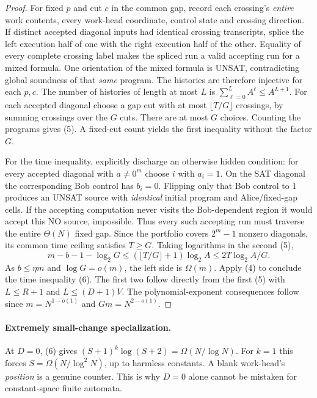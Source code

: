 \documentclass[11pt]{article}
\begin{document}
\begin{proof}
For fixed $p$ and cut $c$ in the common gap, record each
crossing's \emph{entire} work contents, every work-head
coordinate, control state and crossing direction. If distinct
accepted diagonal inputs had identical crossing transcripts,
splice the left execution half of one with the right execution
half of the other. Equality of every complete crossing label
makes the spliced run a valid accepting run for a mixed
formula. One orientation of the mixed formula is UNSAT,
contradicting global soundness of that \emph{same} program.
The histories are therefore injective for each $p,c$.
The number of histories of length at most $L$ is
$\sum_{\ell=0}^L A^\ell\le A^{L+1}$.
For each accepted diagonal choose a gap cut with at most
$\lfloor T/G\rfloor$ crossings, by summing crossings over the
$G$ cuts. There are at most $G$ choices. Counting the programs
gives (5). A fixed-cut count yields the first inequality
without the factor $G$.

For the time inequality, explicitly discharge an otherwise
hidden condition: for every accepted diagonal with $a\ne0^m$
choose $i$ with $a_i=1$. On the SAT diagonal the corresponding
Bob control has $b_i=0$. Flipping only that Bob control to $1$
produces an UNSAT source with \emph{identical} initial program
and Alice/fixed-gap cells. If the accepting computation never
visits the Bob-dependent region it would accept this NO
source, impossible. Thus every such accepting run must
traverse the entire $\Theta(N)$ fixed gap. Since the portfolio
covers $2^m-1$ nonzero diagonals, its common time ceiling
satisfies $T\ge G$. Taking logarithms in the second (5),
\[
  m-b-1-\log_2 G
  \le(\lfloor T/G\rfloor+1)\log_2 A
  \le 2T\log_2 A/G.
\]
As $b\le\eta m$ and $\log G=o(m)$, the left side is
$\Omega(m)$. Apply (4) to conclude the time inequality (6).
The first two follow directly from the first (5) with
$L\le R+1$ and $L\le(D+1)V$.
The polynomial-exponent consequences follow since
$m=N^{1-o(1)}$ and $Gm=N^{2-o(1)}$.
\end{proof}

\paragraph{Extremely small-change specialization.}
At $D=0$, (6) gives
$(S+1)^k\log(S+2)=\Omega(N/\log N)$.
For $k=1$ this forces $S=\Omega(N/\log^2 N)$,
up to harmless constants. A blank work-head's \emph{position}
is a genuine counter. This is why $D=0$ alone cannot be
mistaken for constant-space finite automata.
\end{document}
